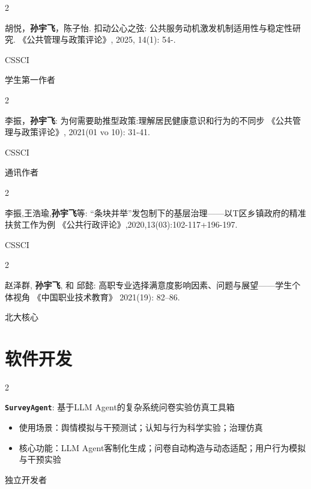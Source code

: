 \documentclass[10pt, letterpaper]{article}
\newenvironment{twocolentry}[2][]{
    \onecolentry
    \def\secondColumn{#2}
    \setcolumnwidth{\fill, 2.5 cm}
    \begin{paracol}{2}
}{
    \switchcolumn \raggedleft \secondColumn
    \end{paracol}
    \endonecolentry
} %
\begin{document}
    \begin{twocolentry}{
        CSSCI
            
        学生第一作者
    }
    胡悦，\textbf{孙宇飞}，陈子怡. 扣动公心之弦: 公共服务动机激发机制适用性与稳定性研究. 《公共管理与政策评论》, 2025, 14(1): 54-.
    \end{twocolentry}

    \begin{twocolentry}{
        CSSCI
        
        通讯作者
    }
    李振，\textbf{孙宇飞}: 为何需要助推型政策:理解居民健康意识和行为的不同步 《公共管理与政策评论》, 2021(01 vo 10): 31-41.
    \end{twocolentry}

    \begin{twocolentry}{
        CSSCI
    }
    李振,王浩瑜,\textbf{孙宇飞}等: “条块并举”发包制下的基层治理——以T区乡镇政府的精准扶贫工作为例 《公共行政评论》,2020,13(03):102-117+196-197.
    \end{twocolentry}

    \begin{twocolentry}{
        北大核心
    }
    赵泽群, \textbf{孙宇飞}, 和 邱懿: 高职专业选择满意度影响因素、问题与展望——学生个体视角 《中国职业技术教育》 2021(19): 82–86.
    \end{twocolentry}

    \section{软件开发}

        \begin{twocolentry}{
            独立开发者

        }
        \textbf{\texttt{SurveyAgent}}:
        基于LLM Agent的复杂系统问卷实验仿真工具箱

        \begin{itemize}[
            topsep=0.005cm,   %
            parsep=0.005cm,   %
            partopsep=0pt,    %
            itemsep=0pt,      %
            leftmargin=0cm + 10pt
        ]
        \item 使用场景：舆情模拟与干预测试；认知与行为科学实验；治理仿真

        \item 核心功能：LLM Agent客制化生成；问卷自动构造与动态适配；用户行为模拟与干预实验

        \end{itemize}
        \end{twocolentry}
\end{document}
